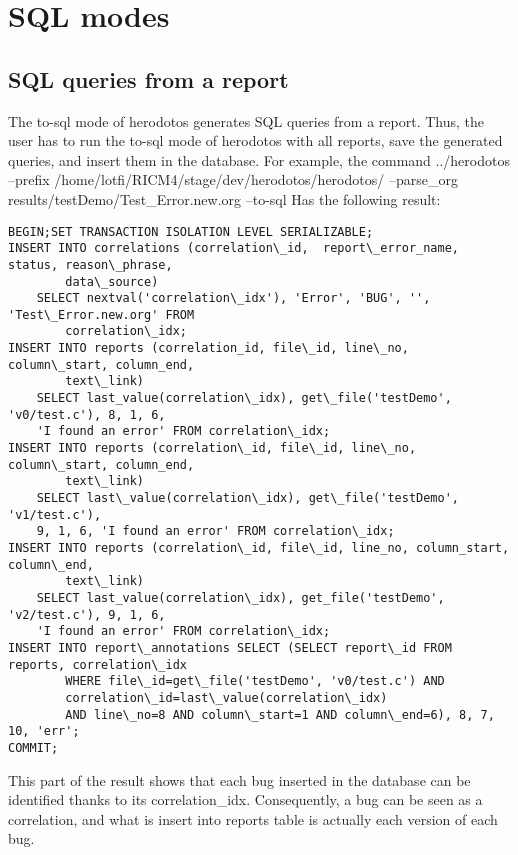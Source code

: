 \chapter{SQL modes}
\label{sec:sql-modes}

\section{SQL queries from a report}
\label{sec:sql-queries}
The to-sql mode of herodotos generates SQL queries from a report. Thus, the user has to run the to-sql mode of herodotos
with all reports, save the generated queries, and insert them in the database.
For example, the command
../herodotos --prefix /home/lotfi/RICM4/stage/dev/herodotos/herodotos/ --parse\_org results/testDemo/Test\_Error.new.org --to-sql
Has the following result:
\begin{lstlisting}
BEGIN;SET TRANSACTION ISOLATION LEVEL SERIALIZABLE;
INSERT INTO correlations (correlation\_id,  report\_error_name, status, reason\_phrase,
        data\_source)
	SELECT nextval('correlation\_idx'), 'Error', 'BUG', '', 'Test\_Error.new.org' FROM
        correlation\_idx;
INSERT INTO reports (correlation_id, file\_id, line\_no, column\_start, column_end,
        text\_link)
	SELECT last_value(correlation\_idx), get\_file('testDemo', 'v0/test.c'), 8, 1, 6,
	'I found an error' FROM correlation\_idx;
INSERT INTO reports (correlation\_id, file\_id, line\_no, column\_start, column_end,
        text\_link)
	SELECT last\_value(correlation\_idx), get\_file('testDemo', 'v1/test.c'),
	9, 1, 6, 'I found an error' FROM correlation\_idx;
INSERT INTO reports (correlation\_id, file\_id, line_no, column_start, column\_end,
        text\_link)
	SELECT last_value(correlation\_idx), get_file('testDemo', 'v2/test.c'), 9, 1, 6,
	'I found an error' FROM correlation\_idx;
INSERT INTO report\_annotations SELECT (SELECT report\_id FROM reports, correlation\_idx 
        WHERE file\_id=get\_file('testDemo', 'v0/test.c') AND
        correlation\_id=last\_value(correlation\_idx)
        AND line\_no=8 AND column\_start=1 AND column\_end=6), 8, 7, 10, 'err';
COMMIT;
\end{lstlisting}

This part of the result shows that each bug inserted in the database can be identified thanks to its correlation\_idx.
Consequently, a bug can be seen as a correlation, and what is insert into reports table is actually each version of
each bug.

